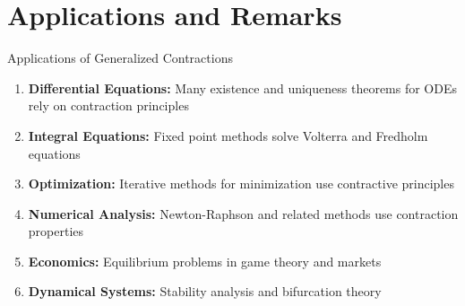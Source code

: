 \documentclass[aspectratio=169,10pt]{beamer}
\begin{document}
\section{Applications and Remarks}

\begin{frame}{Applications of Generalized Contractions}
  \begin{enumerate}
    \item \textbf{Differential Equations:} Many existence and uniqueness theorems for ODEs
      rely on contraction principles

    \vspace{0.2cm}

    \item \textbf{Integral Equations:} Fixed point methods solve Volterra and Fredholm equations

    \vspace{0.2cm}

    \item \textbf{Optimization:} Iterative methods for minimization use contractive principles

    \vspace{0.2cm}

    \item \textbf{Numerical Analysis:} Newton-Raphson and related methods use contraction
      properties

    \vspace{0.2cm}

    \item \textbf{Economics:} Equilibrium problems in game theory and markets

    \vspace{0.2cm}

    \item \textbf{Dynamical Systems:} Stability analysis and bifurcation theory
  \end{enumerate}
\end{frame}
\end{document}
